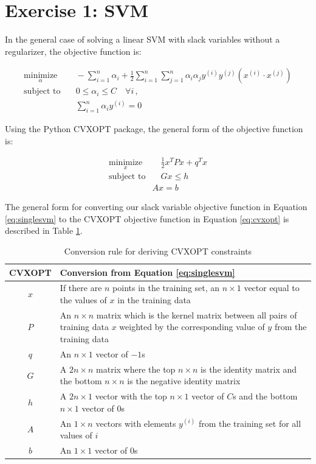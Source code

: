 \documentclass[10pt]{article}
\begin{document}
\section{Exercise 1: SVM}

In the general case of solving a linear SVM with slack variables without a regularizer, the objective function is:

\begin{subequations}
\begin{align}
	\underset{\alpha}{\text{minimize}}
		& \quad -\sum_{i = 1}^n \alpha_i + \frac{1}{2} \sum_{i = 1}^n \sum_{j = 1}^n \alpha_i \alpha_j y^{(i)} y^{(j)} (x^{(i)} \cdot x^{(j)}) \\
	\text{subject to}
		& \quad 0 \leq \alpha_i \leq C \quad \forall i \,, \\
		& \quad \sum_{i = 1}^n \alpha_i y^{(i)} = 0
\end{align}
\label{eq:singlesvm}
\end{subequations}

Using the Python CVXOPT package, the general form of the objective function is:

\begin{subequations}
\begin{align}
	\underset{x}{\text{minimize}}
		& \quad \frac{1}{2}x^T P x + q^T x \\
	\text{subject to} 
		& \quad Gx \leq h \\
		& Ax = b
\end{align}
\label{eq:cvxopt}
\end{subequations}

The general form for converting our slack variable objective function in Equation \ref{eq:singlesvm} to the CVXOPT objective function in Equation \ref{eq:cvxopt} is described in Table \ref{tbl:cvxopttosvm}.

\begin{table}[!ht]
\centering
\begin{tabular}{c|p{}}
	CVXOPT& Conversion from Equation \ref{eq:singlesvm} \\ \hline
	$x$ & If there are $n$ points in the training set, an $n \times 1$ vector equal to the values of $x$ in the training data \\
	$P$ & An $n \times n$ matrix which is the kernel matrix between all pairs of training data $x$ weighted by the corresponding value of $y$ from the training data \\
	$q$ & An $n \times 1$ vector of $-1$s \\
	$G$ & A $2n \times n$ matrix where the top $n \times n$ is the identity matrix and the bottom $n \times n$ is the negative identity matrix \\
	$h$ & A $2n \times 1$ vector with the top $n \times 1$ vector of $C$s and the bottom $n \times 1$ vector of $0$s \\
	$A$ & An $1 \times n$ vectors with elements $y^{(i)}$ from the training set for all values of $i$ \\
	$b$ & An $1 \times 1$ vector of $0$s
\end{tabular}
\caption{Conversion rule for deriving CVXOPT constraints}
\label{tbl:cvxopttosvm}
\end{table}
\end{document}
